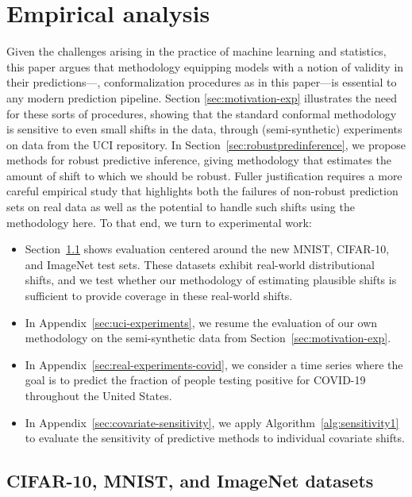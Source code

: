 
\section{Empirical analysis}
\label{sec:exps}

Given the challenges arising in the practice of machine learning and
statistics, this paper argues that methodology equipping models with a
notion of validity in their predictions---\eg, conformalization procedures
as in this paper---is essential to any modern prediction pipeline.  Section
\ref{sec:motivation-exp} illustrates the need for these sorts of procedures,
showing that the standard conformal methodology is sensitive to even small
shifts in the data, through (semi-synthetic) experiments on data from the
UCI repository.  In Section~\ref{sec:robustpredinference}, we propose
methods for robust predictive inference, giving methodology that estimates
the amount of shift to which we should be robust.  Fuller justification
requires a more careful empirical study that highlights both the failures of
non-robust prediction sets on real data as well as the potential to handle
such shifts using the methodology here.  To that end, we turn to
experimental work:

\begin{itemize}
\item Section~\ref{sec:real-experiments} shows
  evaluation centered around the new MNIST, CIFAR-10, and ImageNet test
  sets. These datasets exhibit real-world distributional
  shifts, and we test whether our methodology of estimating
  plausible shifts is sufficient to provide coverage in these real-world shifts.
  \item In Appendix~\ref{sec:uci-experiments},
  we resume the evaluation of our own methodology on the
  semi-synthetic data from Section~\ref{sec:motivation-exp}.
\item In Appendix~\ref{sec:real-experiments-covid}, we consider a time
  series where the goal is to predict the fraction of people testing
  positive for COVID-19 throughout the United States.
\item In Appendix~\ref{sec:covariate-sensitivity},
  we apply Algorithm~\ref{alg:sensitivity1} to evaluate the sensitivity
  of predictive methods to individual covariate shifts.
\end{itemize}

\subsection{CIFAR-10, MNIST, and ImageNet datasets}
\label{sec:real-experiments}

